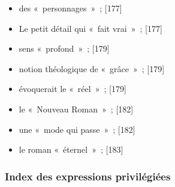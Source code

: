 \documentclass[12pt, a4paper]{article}
\begin{document}
\begin{itemize}
    \item des «~personnages~»{\color{gray}~; [177]}

    \item Le petit détail qui «~fait vrai~»{\color{gray}~; [177]}

    \item sens «~profond~»{\color{gray}~; [179]}

    \item notion théologique de «~grâce~»{\color{gray}~; [179]}

    \item évoquerait le «~réel~»{\color{gray}~; [179]}

    \item le «~Nouveau Roman~»{\color{gray}~; [182]}

    \item une «~mode qui passe~»{\color{gray}~; [182]}

    \item le roman «~éternel~»{\color{gray}~; [183]}
\end{itemize}



\subsubsection{Index des expressions privilégiées}
    
\end{document}
